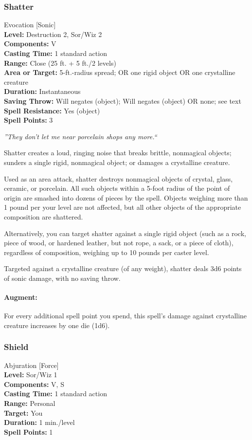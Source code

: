 \subsubsection{Shatter}
\label{Spell:Shatter}
Evocation [Sonic]
\\ \textbf{Level:} Destruction 2, Sor/Wiz 2
\\ \textbf{Components:} V
\\ \textbf{Casting Time:} 1 standard action
\\ \textbf{Range:} Close (25 ft. + 5 ft./2 levels)
\\ \textbf{Area or Target:} 5-ft.-radius spread; OR one rigid object OR one crystalline creature
\\ \textbf{Duration:} Instantaneous
\\ \textbf{Saving Throw:} Will negates (object); Will negates (object) OR none; see text
\\ \textbf{Spell Resistance:} Yes (object)
\\ \textbf{Spell Points:} 3

\emph{''They don't let me near porcelain shops any more.``}

Shatter creates a loud, ringing noise that breaks brittle, nonmagical objects; sunders a single rigid, nonmagical object; or damages a crystalline creature.

Used as an area attack, shatter destroys nonmagical objects of crystal, glass, ceramic, or porcelain. 
All such objects within a 5-foot radius of the point of origin are smashed into dozens of pieces by the spell. 
Objects weighing more than 1 pound per your level are not affected, but all other objects of the appropriate composition are shattered.

Alternatively, you can target shatter against a single rigid object (such as a rock, piece of wood, or hardened leather, but not rope, a sack, or a piece of cloth), 
regardless of composition, weighing up to 10 pounds per caster level. 

Targeted against a crystalline creature (of any weight), shatter deals 3d6 points of sonic damage, with no saving throw.

\paragraph{Augment:} For every additional spell point you spend, this spell's damage against crystalline creature increases by one die (1d6).
\subsubsection{Shield}
\label{Spell:Shield}
Abjuration [Force]
\\ \textbf{Level:} Sor/Wiz 1
\\ \textbf{Components:} V, S
\\ \textbf{Casting Time:} 1 standard action
\\ \textbf{Range:} Personal
\\ \textbf{Target:} You
\\ \textbf{Duration:} 1 min./level
\\ \textbf{Spell Points:} 1

